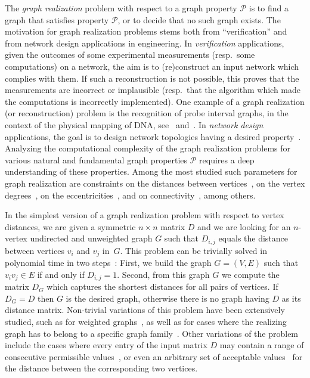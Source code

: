 \documentclass[a4paper,UKenglish,cleveref, autoref, thm-restate]{lipics-v2021}
\begin{document}
The \emph{graph realization} problem with respect to a graph property $\mathcal{P}$ is to find a graph that satisfies property $\mathcal{P}$, or to decide that no such graph exists. 
The motivation for graph realization problems stems both from ``verification'' and from network design applications in engineering. 
In \emph{verification} applications, given the outcomes of some experimental measurements (resp.~some computations) on a network, 
the aim is to (re)construct an input network which complies with them. 
If such a reconstruction is not possible, this proves that the measurements are incorrect or implausible (resp.~that the algorithm which made the computations is incorrectly implemented). 
One example of a graph realization (or reconstruction) problem is the recognition of probe interval graphs, in the context of the physical mapping of DNA, see~\cite{McMorris98,McConnellS02} and~\cite[Chapter 4]{GolumbicTrenk04}.
In \emph{network design} applications, the goal is to design network topologies having a desired property~\cite{augustine2022distributed,grotschel1995design}.
Analyzing the computational complexity of the graph realization problems for various natural and fundamental graph properties $\mathcal{P}$ requires a deep understanding of these properties.
Among the most studied such parameters for graph realization 
are constraints on the distances between vertices~\cite{barNoy2022GraphRealization,barNoy2021composed,hakimi1965distance,chung2001distance,bixby1988almost,culberson1989fast}, 
on the vertex degrees~\cite{GolovachM17,gomory1961multi,hakimi1962realizability,Bar-NoyCPR20,erdos1960graphs}, 
on the eccentricities~\cite{barNoy2020efficiently,hell2009linear,behzad1976eccentric,lesniak1975eccentric}, and on connectivity~\cite{fulkerson1960zero,frank1992augmenting,chen1966realization,frank1994connectivity,frank1970connectivity,gomory1961multi}, among others. 


In the simplest version of a graph realization problem with respect to vertex distances, 
we are given a symmetric $n \times n$ matrix $D$ and we are looking for an $n$-vertex undirected and unweighted graph $G$ such that $D_{i,j}$ equals the distance between vertices $v_i$ and $v_j$ in~$G$. This problem can be trivially solved in polynomial time in two steps~\cite{hakimi1965distance}: First, we build the graph $G=(V,E)$ such that $v_i v_j \in E$ if and only if $D_{i,j}=1$. Second, from this graph $G$ we compute the matrix $D_G$ which captures the shortest distances for all pairs of vertices. If $D_G = D$ then $G$ is the desired graph, otherwise there is no graph having $D$ as its distance matrix. 
Non-trivial variations of this problem have been extensively studied, such as for weighted graphs~\cite{hakimi1965distance,Patrinos-Hakimi-72}, as well as for cases where the realizing graph has to belong to a specific graph family~\cite{hakimi1965distance, barNoy2021composed}. Other variations of the problem include the cases where every entry of the input matrix $D$ may contain a range of consecutive permissible values~\cite{barNoy2021composed,Rubei16,Tamura93}, or even an arbitrary set of acceptable values~\cite{barNoy2022GraphRealization} for the distance between the corresponding two vertices. 
\end{document}
